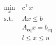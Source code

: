 \documentclass[preview]{standalone}
\begin{document}
\begin{align*}
\begin{aligned}\min_{x} &\  c ^\top x \\\text{s.t.} &\  A  x \leq  b  \\&\ A_\text{eq} x = b_\text{eq} \\&\ l \leq x \leq u \end{aligned}
\end{align*}
\end{document}
